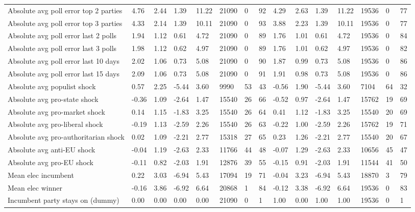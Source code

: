 \begin{longtable}{lllllllllllllll}
Absolute avg poll error top 2 parties & 4.76 & 2.44 & 1.39 & 11.22 & 21090 & 0 & 92 & 4.29 & 2.63 & 1.39 & 11.22 & 19536 & 0 & 77\\
Absolute avg poll error top 3 parties & 4.33 & 2.14 & 1.39 & 10.11 & 21090 & 0 & 93 & 3.88 & 2.23 & 1.39 & 10.11 & 19536 & 0 & 77\\
Absolute avg poll error last 2 polls & 1.94 & 1.12 & 0.61 & 4.72 & 21090 & 0 & 89 & 1.76 & 1.01 & 0.61 & 4.72 & 19536 & 0 & 84\\
\addlinespace
Absolute avg poll error last 3 polls & 1.98 & 1.12 & 0.62 & 4.97 & 21090 & 0 & 89 & 1.76 & 1.01 & 0.62 & 4.97 & 19536 & 0 & 82\\
Absolute avg poll error last 10 days & 2.02 & 1.06 & 0.73 & 5.08 & 21090 & 0 & 90 & 1.87 & 0.99 & 0.73 & 5.08 & 19536 & 0 & 86\\
Absolute avg poll error last 15 days & 2.09 & 1.06 & 0.73 & 5.08 & 21090 & 0 & 91 & 1.91 & 0.98 & 0.73 & 5.08 & 19536 & 0 & 86\\
Absolute avg populist shock & 0.57 & 2.25 & -5.44 & 3.60 & 9990 & 53 & 43 & -0.56 & 1.90 & -5.44 & 3.60 & 7104 & 64 & 32\\
Absolute avg pro-state shock & -0.36 & 1.09 & -2.64 & 1.47 & 15540 & 26 & 66 & -0.52 & 0.97 & -2.64 & 1.47 & 15762 & 19 & 69\\
\addlinespace
Absolute avg pro-market shock & 0.14 & 1.15 & -1.83 & 3.25 & 15540 & 26 & 64 & 0.41 & 1.12 & -1.83 & 3.25 & 15540 & 20 & 69\\
Absolute avg pro-liberal shock & -0.19 & 1.13 & -2.59 & 2.26 & 15540 & 26 & 63 & -0.22 & 1.00 & -2.59 & 2.26 & 15762 & 19 & 71\\
Absolute avg pro-authoritarian shock & 0.02 & 1.09 & -2.21 & 2.77 & 15318 & 27 & 65 & 0.23 & 1.26 & -2.21 & 2.77 & 15540 & 20 & 67\\
Absolute avg anti-EU shock & -0.04 & 1.19 & -2.63 & 2.33 & 11766 & 44 & 48 & -0.07 & 1.29 & -2.63 & 2.33 & 10656 & 45 & 47\\
Absolute avg pro-EU shock & -0.11 & 0.82 & -2.03 & 1.91 & 12876 & 39 & 55 & -0.15 & 0.91 & -2.03 & 1.91 & 11544 & 41 & 50\\
\addlinespace
Mean elec incumbent & 0.22 & 3.03 & -6.94 & 5.43 & 17094 & 19 & 71 & -0.04 & 3.23 & -6.94 & 5.43 & 18870 & 3 & 79\\
Mean elec winner & -0.16 & 3.86 & -6.92 & 6.64 & 20868 & 1 & 84 & -0.12 & 3.38 & -6.92 & 6.64 & 19536 & 0 & 83\\
Incumbent party stays on (dummy) & 0.00 & 0.00 & 0.00 & 0.00 & 21090 & 0 & 1 & 1.00 & 0.00 & 1.00 & 1.00 & 19536 & 0 & 1\\

\end{longtable}
